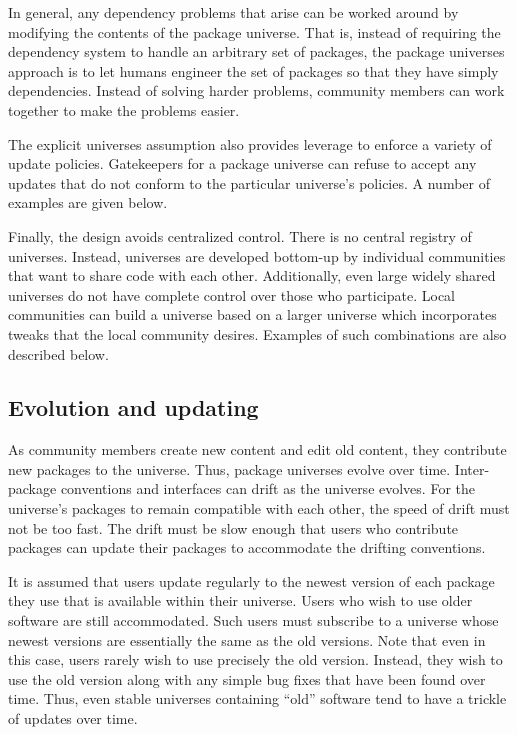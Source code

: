 \documentclass{article}
\begin{document}
In general, any dependency problems that arise can be worked around by
modifying the contents of the package universe.  That is, instead of
requiring the dependency system to handle an arbitrary set of
packages, the package universes approach is to let humans engineer the
set of packages so that they have simply dependencies.  Instead of
solving harder problems, community members can work together to make
the problems easier.


The explicit universes assumption also provides leverage to enforce a
variety of update policies.  Gatekeepers for a package universe can
refuse to accept any updates that do not conform to the particular
universe's policies.  A number of examples are given below.

Finally, the design avoids centralized control.  There is no central
registry of universes.  Instead, universes are developed bottom-up by
individual communities that want to share code with each other.
Additionally, even large widely shared universes do not have complete
control over those who participate.  Local communities can build a
universe based on a larger universe which incorporates tweaks that the
local community desires.  Examples of such combinations are also
described below.



\subsection{Evolution and updating}
As community members create new content and edit old content, they
contribute new packages to the universe.  Thus, package universes
evolve over time.  Inter-package conventions and interfaces can drift
as the universe evolves.  For the universe's packages to remain
compatible with each other, the speed of drift must not be too fast.
The drift must be slow enough that users who contribute packages can
update their packages to accommodate the drifting conventions.

It is assumed that users update regularly to the newest version of
each package they use that is available within their universe.  Users
who wish to use older software are still accommodated.  Such users must
subscribe to a universe whose newest versions are essentially the same
as the old versions.  Note that even in this case, users rarely wish
to use precisely the old version.  Instead, they wish to use the old
version along with any simple bug fixes that have been found over
time.  Thus, even stable universes containing ``old'' software tend to
have a trickle of updates over time.
\end{document}
